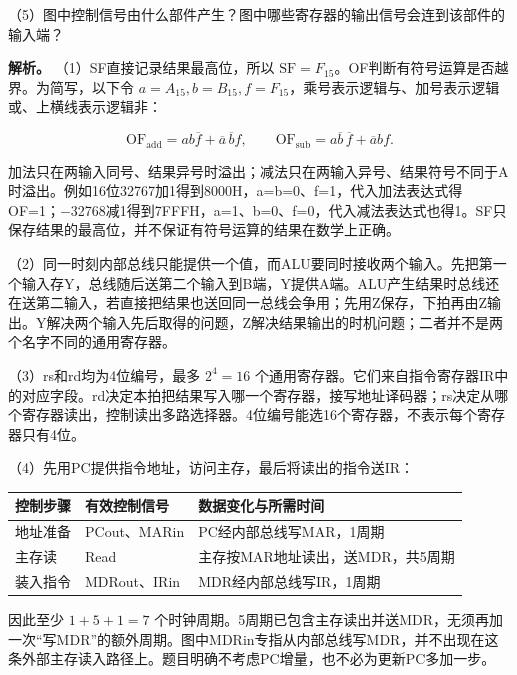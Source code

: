 （5）图中控制信号由什么部件产生？图中哪些寄存器的输出信号会连到该部件的输入端？

\textbf{解析。} （1）SF直接记录结果最高位，所以 \(\mathrm{SF}=F_{15}\)。OF判断有符号运算是否越界。为简写，以下令 \(a=A_{15},b=B_{15},f=F_{15}\)，乘号表示逻辑与、加号表示逻辑或、上横线表示逻辑非：

\[
\mathrm{OF}_{\mathrm{add}}=ab\overline f+\overline a\,\overline b f,
\qquad
\mathrm{OF}_{\mathrm{sub}}=a\overline b\,\overline f+\overline a b f.
\]

加法只在两输入同号、结果异号时溢出；减法只在两输入异号、结果符号不同于A时溢出。例如16位32767加1得到8000H，a=b=0、f=1，代入加法表达式得OF=1；\ensuremath{-}32768减1得到7FFFH，a=1、b=0、f=0，代入减法表达式也得1。SF只保存结果的最高位，并不保证有符号运算的结果在数学上正确。

（2）同一时刻内部总线只能提供一个值，而ALU要同时接收两个输入。先把第一个输入存Y，总线随后送第二个输入到B端，Y提供A端。ALU产生结果时总线还在送第二输入，若直接把结果也送回同一总线会争用；先用Z保存，下拍再由Z输出。Y解决两个输入先后取得的问题，Z解决结果输出的时机问题；二者并不是两个名字不同的通用寄存器。

（3）rs和rd均为4位编号，最多 \(2^4=16\) 个通用寄存器。它们来自指令寄存器IR中的对应字段。rd决定本拍把结果写入哪一个寄存器，接写地址译码器；rs决定从哪个寄存器读出，控制读出多路选择器。4位编号能选16个寄存器，不表示每个寄存器只有4位。

（4）先用PC提供指令地址，访问主存，最后将读出的指令送IR：

\par\medskip\noindent\begin{minipage}{\linewidth}\fontsize{9.3}{12}\selectfont\begin{tabularx}{\linewidth}{@{}YYY@{}}
\toprule\noalign{}
控制步骤 & 有效控制信号 & 数据变化与所需时间 \\
\midrule\noalign{}


地址准备 & PCout、MARin & PC经内部总线写MAR，1周期 \\
主存读 & Read & 主存按MAR地址读出，送MDR，共5周期 \\
装入指令 & MDRout、IRin & MDR经内部总线写IR，1周期 \\
\bottomrule\end{tabularx}
\end{minipage}\par\medskip

因此至少 \(1+5+1=7\) 个时钟周期。5周期已包含主存读出并送MDR，无须再加一次``写MDR''的额外周期。图中MDRin专指从内部总线写MDR，并不出现在这条外部主存读入路径上。题目明确不考虑PC增量，也不必为更新PC多加一步。


